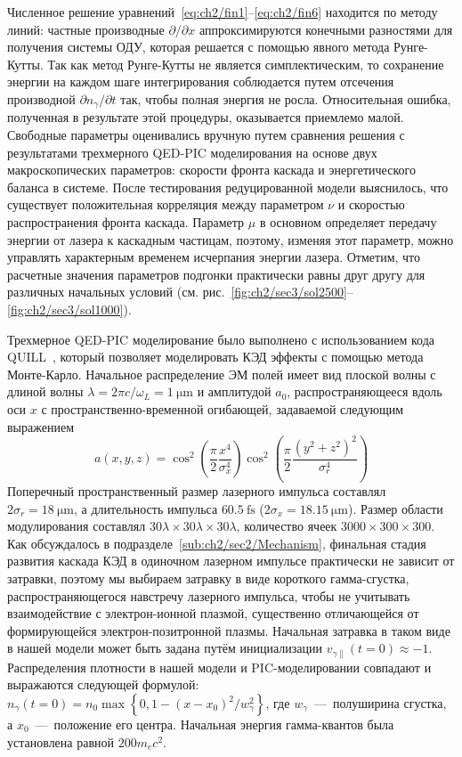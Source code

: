 Численное решение уравнений~\eqref{eq:ch2/fin1}--\eqref{eq:ch2/fin6} находится по методу линий: частные производные $\partial/\partial x$ аппроксимируются конечными разностями для получения системы ОДУ, которая решается с помощью явного метода Рунге-Кутты.
Так как метод Рунге-Кутты не является симплектическим, то сохранение энергии на каждом шаге интегрирования соблюдается путем отсечения производной $\partial n_\gamma /\partial t$ так, чтобы полная энергия не росла.
Относительная ошибка, полученная в результате этой процедуры, оказывается приемлемо малой.
Свободные параметры оценивались вручную путем сравнения решения с результатами трехмерного QED-PIC моделирования на основе двух макроскопических параметров: скорости фронта каскада и энергетического баланса в системе.
После тестирования редуцированной модели выяснилось, что существует положительная корреляция между параметром $\nu$ и скоростью распространения фронта каскада.
Параметр $\mu$ в основном определяет передачу энергии от лазера к каскадным частицам, поэтому, изменяя этот параметр, можно управлять характерным временем исчерпания энергии лазера.
Отметим, что расчетные значения параметров подгонки практически равны друг другу для различных начальных условий (см. рис.~\ref{fig:ch2/sec3/sol2500}--\ref{fig:ch2/sec3/sol1000}).

Трехмерное QED-PIC моделирование было выполнено с использованием кода QUILL~\cite{QUILL}, который позволяет моделировать КЭД эффекты с помощью метода Монте-Карло.
Начальное распределение ЭМ полей имеет вид плоской волны с длиной волны $\lambda=2\pi c/\omega_{L}=\SI{1}{\um}$ и амплитудой $a_0 $, распространяющееся вдоль оси $x$ с пространственно-временной огибающей, задаваемой следующим выражением
\begin{equation}
a(x,y,z) =  \cos^2 \left( \frac{ \pi }{2}   \frac{x^4}{\sigma_x^4 } \right) \cos^2 \left( \frac{ \pi}{2}   \frac{\left( y^2 + z^2 \right)^2}{\sigma_r^4 } \right)
\end{equation}
Поперечный пространственный размер лазерного импульса составлял $2\sigma_r = \SI{18}{\um}$, а длительность импульса $\SI{60.5}{\femto\second}$ ($2\sigma_x = \SI{18.15}{\um}$).
Размер области модулирования составлял $30\lambda\times 30\lambda\times 30\lambda$, количество ячеек $3000\times 300\times 300$.
Как обсуждалось в подразделе~\ref{sub:ch2/sec2/Mechanism}, финальная стадия развития каскада КЭД в одиночном лазерном импульсе практически не зависит от затравки, поэтому мы выбираем затравку в виде короткого гамма-сгустка, распространяющегося навстречу лазерного импульса, чтобы не учитывать взаимодействие с электрон-ионной плазмой, существенно отличающейся от формирующейся электрон-позитронной плазмы.
Начальная затравка в таком виде в нашей модели может быть задана путём инициализации $v_{\gamma\parallel}(t=0)\approx-1$.
Распределения плотности в нашей модели и PIC-моделировании совпадают и выражаются следующей формулой: $n_\gamma(t=0)=n_0\max\left\{0, 1 - (x-x_0)^2/w_\gamma ^2 \right\}$, где $w_\gamma$~---~полуширина сгустка, а $x_0$~---~положение его центра.
Начальная энергия гамма-квантов была установлена равной $200 m_e c^2$.

